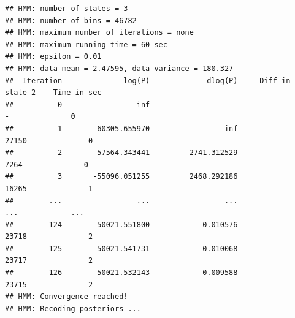 \documentclass[11pt]{article}\usepackage[]{graphicx}\usepackage[]{color}
\makeatletter
\newenvironment{kframe}{%
 \def\at@end@of@kframe{}%
 \ifinner\ifhmode%
  \def\at@end@of@kframe{\end{minipage}}%
  \begin{minipage}{\columnwidth}%
 \fi\fi%
 \def\FrameCommand##1{\hskip\@totalleftmargin \hskip-\fboxsep
 \colorbox{shadecolor}{##1}\hskip-\fboxsep
     \hskip-\linewidth \hskip-\@totalleftmargin \hskip\columnwidth}%
 \MakeFramed {\advance\hsize-\width
   \@totalleftmargin\z@ \linewidth\hsize
   \@setminipage}}%
 {\par\unskip\endMakeFramed%
 \at@end@of@kframe}
\newenvironment{knitrout}{}{} %
\makeatother
\begin{document}
\begin{scriptsize}
\begin{knitrout}
\begin{kframe}
{\ttfamily\noindent\itshape\color{messagecolor}{\#\# Replaced read counts > 163 (99.9\% quantile) by 163 in 46 bins. Set option 'read.cutoff.quantile=1' to disable this filtering. This filtering was done to increase the speed of the HMM and should not affect the results.\\\#\# ------------------------------------ Try 1 of 1 -------------------------------------}}\begin{verbatim}
## HMM: number of states = 3
## HMM: number of bins = 46782
## HMM: maximum number of iterations = none
## HMM: maximum running time = 60 sec
## HMM: epsilon = 0.01
## HMM: data mean = 2.47595, data variance = 180.327
##  Iteration              log(P)             dlog(P)     Diff in state 2    Time in sec
##          0                -inf                   -                   -              0
##          1       -60305.655970                 inf               27150              0
##          2       -57564.343441         2741.312529                7264              0
##          3       -55096.051255         2468.292186               16265              1
##        ...                 ...                 ...                 ...            ...
##        124       -50021.551800            0.010576               23718              2
##        125       -50021.541731            0.010068               23717              2
##        126       -50021.532143            0.009588               23715              2
## HMM: Convergence reached!
## HMM: Recoding posteriors ...
\end{verbatim}


{\ttfamily\noindent\itshape\color{messagecolor}{\#\# Calculating states from posteriors ... 0.24s\\\#\# Making segmentation ... 0.44s}}\end{kframe}
\end{knitrout}


\end{scriptsize}
\end{document}
